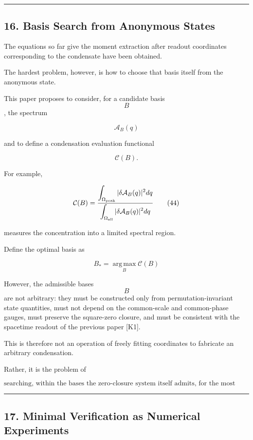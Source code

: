 \documentclass[
  a4paper,
]{article}
\begin{document}
\begin{center}\rule{0.5\linewidth}{0.5pt}\end{center}

\subsection{16. Basis Search from Anonymous
States}\label{basis-search-from-anonymous-states}

The equations so far give the moment extraction after readout
coordinates corresponding to the condensate have been obtained.

The hardest problem, however, is how to choose that basis itself from
the anonymous state.

This paper proposes to consider, for a candidate basis \[B\], the
spectrum

\[
\mathcal A_B(q)
\]

and to define a condensation evaluation functional

\[
\mathcal C(B).
\]

For example,

\[
\mathcal C(B)
=
\frac{
\displaystyle
\int_{\Omega_{\rm peak}}
|\delta\mathcal A_B(q)|^2dq
}{
\displaystyle
\int_{\Omega_{\rm all}}
|\delta\mathcal A_B(q)|^2dq
}
\tag{44}
\]

measures the concentration into a limited spectral region.

Define the optimal basis as

\[
\boxed{
B_*
=
\operatorname*{arg\,max}_{B}
\mathcal C(B)
}
\tag{45}
\]

However, the admissible bases \[B\] are not arbitrary: they must be
constructed only from permutation-invariant state quantities, must not
depend on the common-scale and common-phase gauges, must preserve the
square-zero closure, and must be consistent with the spacetime readout
of the previous paper {[}K1{]}.

This is therefore not an operation of freely fitting coordinates to
fabricate an arbitrary condensation.

Rather, it is the problem of

\[
\boxed{
\text{searching, within the bases the zero-closure system itself admits, for the most self-consistently localized mode}
}
\]

\begin{center}\rule{0.5\linewidth}{0.5pt}\end{center}

\subsection{17. Minimal Verification as Numerical
Experiments}\label{minimal-verification-as-numerical-experiments}
\end{document}

